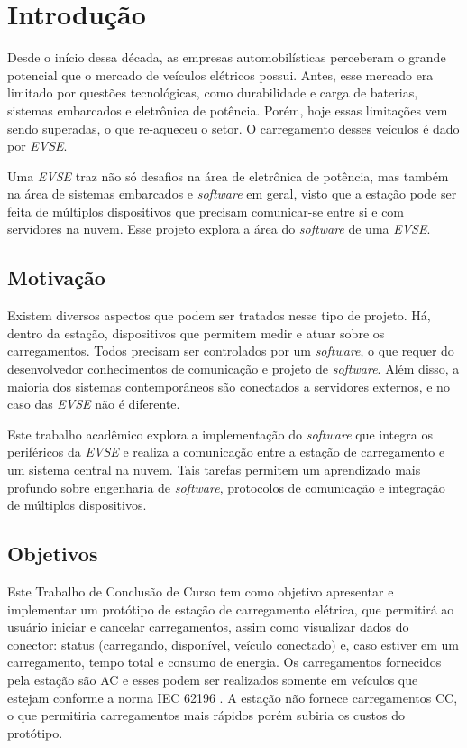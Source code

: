 \chapter{Introdução}
\label{stateofart:intro}

  Desde o início dessa década, as empresas automobilísticas perceberam o grande potencial que o mercado de veículos elétricos possui. Antes, esse mercado era limitado por questões tecnológicas, como durabilidade e carga de baterias,  sistemas embarcados e eletrônica de potência. Porém, hoje essas limitações vem sendo superadas, o que re-aqueceu o setor. O carregamento desses veículos é dado por \textit{\ac{EVSE}}.

  Uma \textit{\ac{EVSE}} traz não só desafios na área de eletrônica de potência, mas também na área de sistemas embarcados e \textit{software} em geral, visto que a estação pode ser feita de múltiplos dispositivos que precisam comunicar-se entre si e com servidores na nuvem. Esse projeto explora a área do \textit{software} de uma \textit{\ac{EVSE}}.

  \section{Motivação}
  \label{stateofart:intro:motivation}

    Existem diversos aspectos que podem ser tratados nesse tipo de projeto. Há, dentro da estação, dispositivos que permitem medir e atuar sobre os carregamentos. Todos precisam ser controlados por um \textit{software}, o que requer do desenvolvedor conhecimentos de comunicação e projeto de \textit{software}. Além disso, a maioria dos sistemas contemporâneos são conectados a servidores externos, e no caso das \textit{\ac{EVSE}} não é diferente.

    Este trabalho acadêmico explora a implementação do \textit{software} que integra os periféricos da \textit{\ac{EVSE}} e realiza a comunicação entre a estação de carregamento e um sistema central na nuvem. Tais tarefas permitem um aprendizado mais profundo sobre engenharia de \textit{software}, protocolos de comunicação e integração de múltiplos dispositivos.

  \section{Objetivos}
  \label{stateofart:intro:objectives}

    Este Trabalho de Conclusão de Curso tem como objetivo apresentar e implementar um protótipo de estação de carregamento elétrica, que permitirá ao usuário iniciar e cancelar carregamentos, assim como visualizar dados do conector: status (carregando, disponível, veículo conectado) e, caso estiver em um carregamento, tempo total e consumo de energia. Os carregamentos fornecidos pela estação são \ac{AC} e esses podem ser realizados somente em veículos que estejam conforme a norma IEC 62196 \cite{iec-62196}. A estação não fornece carregamentos \ac{CC}, o que permitiria carregamentos mais rápidos porém subiria os custos do protótipo.

